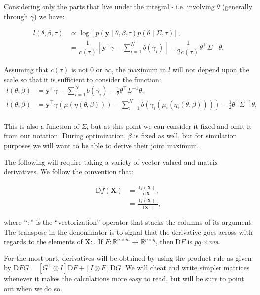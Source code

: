 \documentclass[10pt]{article}
\begin{document}
Considering only the parts that live under the integral -
i.e. involving \(\theta\) (generally through $\gamma$) we have:

\begin{align*}
l(\theta, \beta, \tau) & \propto \log \left[ p(\bm{y} \mid \theta, \beta, \tau)
p(\theta \mid \Sigma, \tau) \right], \\ 
& = \dfrac{1}{c(\tau)}\left[\bm{y}^\top\gamma - \sum_{i=1}^N b(\gamma_i) \right] -
 \dfrac{1}{2c(\tau)}\theta^\top\Sigma^{-1}\theta.
\end{align*}

Assuming that \(c(\tau)\) is not \(0\) or \(\infty\), the maximum in
\(l\) will not depend upon the scale so that it is sufficient to
consider the function:
\begin{align*}
l(\theta, \beta) & = \bm{y}^\top\gamma - \sum_{i=1}^Nb(\gamma_i) -
  \frac{1}{2}\theta^\top\Sigma^{-1}\theta, \\
l(\theta, \beta) & = \bm{y}^\top\gamma(\mu(\eta(\theta, \beta))) -
\sum_{i=1}^Nb(\gamma_i(\mu_i(\eta_i(\theta, \beta)))) -
  \frac{1}{2}\theta^\top\Sigma^{-1}\theta, \\
\end{align*}

This is also a function of \(\Sigma\), but at this point we
can consider it fixed and omit it from our notation. During
optimization, $\beta$ is fixed as well, but for simulation purposes we
will want to be able to derive their joint maximum.

The following will require taking a variety of vector-valued and
matrix derivatives. We follow the convention that:

\begin{align*}
\mathrm{D}f(\bm{X}) & =\frac{\mathrm{d}f(\bm{X})}{\mathrm{d}\bm{X}}, \\
& = \frac{\mathrm{d}f(\bm{X}):}{\mathrm{d}\bm{X}^\top :},
\end{align*}

where ``$:$'' is the ``vectorization'' operator that stacks the
columns of its argument. The transpose in the denominator is to signal
that the derivative goes across with regards to the elements of
$\bm{X}:$. If $F: \mathbb{R}^{n\times m} \rightarrow
\mathbb{R}^{p\times q}$, then $\mathrm{D}F$ is
$pq\times nm$.

For the most part, derivatives will be obtained by using the product
rule as given by $\mathrm{D}FG = [G^\top
\otimes I]\mathrm{D}F+ [I \otimes F]\mathrm{D}G$. We will cheat and
write simpler matrices whenever it makes the calculations more easy to
read, but will be sure to point out when we do so.
\end{document}
